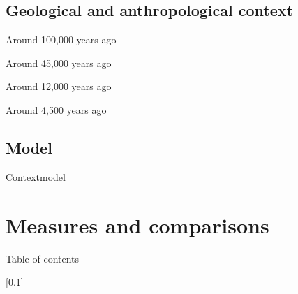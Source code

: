 \documentclass[10pt,aspectratio=43]{beamer}
\begin{document}
\subsection{Geological and anthropological context}

\begin{frame}{}{Around 100,000 years ago}
\end{frame}

\addtocounter{framenumber}{-1}
\begin{frame}{}{Around 45,000 years ago}
\end{frame}

\addtocounter{framenumber}{-1}
\begin{frame}{}{Around 12,000 years ago}
\end{frame}

\addtocounter{framenumber}{-1}
\begin{frame}{}{Around 4,500 years ago}
\end{frame}

\subsection{Model}
\masseyBrand{}{}{}{}
\begin{frame}{Context}{model}
\end{frame}


\section{Measures and comparisons}
\begin{frame}{}{Table of contents}
\tableofcontents[currentsection, subsectionstyle=show/show/hide]
\end{frame}

[0.1]{}{}{}
\end{document}
